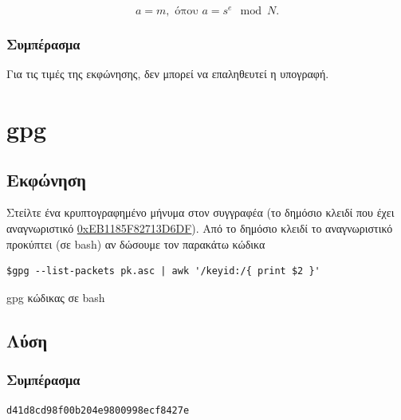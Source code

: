 \documentclass[oneside]{article}
\let\t\texttt
\begin{document}
\begin{equation}
    a = m, \text{ όπου } a = s^e \mod{N}.
\end{equation}

\subsubsection{Συμπέρασμα}

Για τις τιμές της εκφώνησης, δεν μπορεί να επαληθευτεί η υπογραφή.

\section{gpg}

\subsection{Εκφώνηση} 

Στείλτε ένα κρυπτογραφημένο μήνυμα στον συγγραφέα (το δημόσιο κλειδί που έχει αναγνωριστικό \href{https://github.com/drazioti/my_public_key/blob/main/pk.asc}{0xEB1185F82713D6DF}). Από το δημόσιο κλειδί το αναγνωριστικό προκύπτει (σε bash) αν δώσουμε τον παρακάτω κώδικα

\begin{listing}[H]
\begin{verbatim}
$gpg --list-packets pk.asc | awk '/keyid:/{ print $2 }'
\end{verbatim}
\caption{gpg κώδικας σε bash}
\label{algo:bash}
\end{listing}

\subsection{Λύση}

\subsubsection{Συμπέρασμα}

\begin{center}
    \t{d41d8cd98f00b204e9800998ecf8427e}
\end{center}

\end{document}
